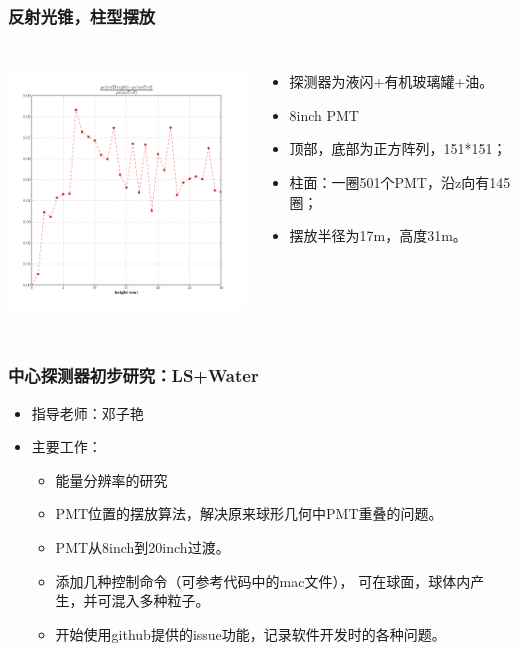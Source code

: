 \begin{frame}
    \frametitle{反射光锥，柱型摆放}
    \begin{columns}
        \column{6.0cm} 
            \includegraphics[height=7cm, keepaspectratio]{data/tube_full_random.png}

        \column{4.0cm} 
            \begin{itemize}
                \item 探测器为液闪+有机玻璃罐+油。
                \item 8inch PMT
                \item 顶部，底部为正方阵列，151*151；
                \item 柱面：一圈501个PMT，沿z向有145圈；
                \item 摆放半径为17m，高度31m。
            \end{itemize}
    \end{columns}
\end{frame}

\begin{frame}
    \frametitle{中心探测器初步研究：LS+Water}
    \begin{itemize}
        \item 指导老师：邓子艳
        \item 主要工作：
            \begin{itemize}
                \item 能量分辨率的研究
                \item PMT位置的摆放算法，解决原来球形几何中PMT重叠的问题。
                \item PMT从8inch到20inch过渡。
                \item 添加几种控制命令（可参考代码中的mac文件），
                      可在球面，球体内产生，并可混入多种粒子。
                \item 开始使用github提供的issue功能，记录软件开发时的各种问题。
            \end{itemize}
    \end{itemize}
\end{frame}

